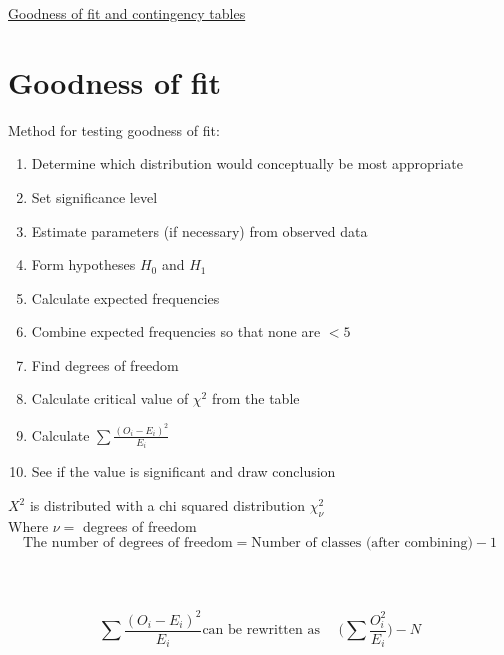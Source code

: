\documentclass{article}[18pt]
\begin{document}
\begin{center}
\underline{\huge Goodness of fit and contingency tables}
\end{center}
\section{Goodness of fit}
Method for testing goodness of fit:
\begin{enumerate}
\item Determine which distribution would conceptually be most appropriate
\item Set significance level
\item Estimate parameters (if necessary) from observed data
\item Form hypotheses $H_0$ and $H_1$
\item Calculate expected frequencies
\item Combine expected frequencies so that none are $<5$
\item Find degrees of freedom
\item Calculate critical value of $\chi^2$ from the table
\item Calculate $\sum\frac{(O_i-E_i)^2}{E_i}$
\item See if the value is significant and draw conclusion
\end{enumerate}
$X^2$ is distributed with a chi squared distribution $\chi^2_\nu$\\
Where $\nu=$ degrees of freedom\\
$$\textrm{The number of degrees of freedom}=\textrm{Number of classes (after combining)}-1$$
\\
\\
\\
$$\sum\frac{(O_i-E_i)^2}{E_i} \textrm{can be rewritten as  } \quad \Bigg(\sum\frac{O^2_i}{E_i}\Bigg)-N$$
\newpage
\end{document}
